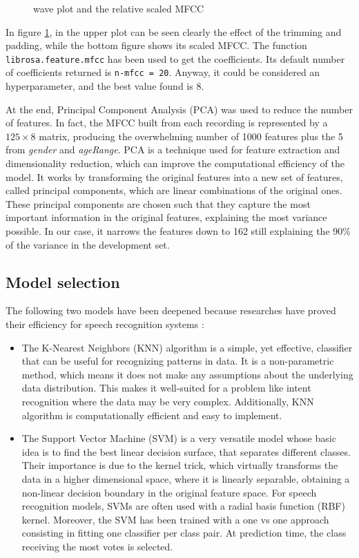 \documentclass[conference]{IEEEtran}
\begin{document}
\begin{figure}
    \centering
    
    \caption{wave plot and the relative scaled MFCC}
    \label{fig:mfcc}
\end{figure}

In figure \ref{fig:mfcc}, in the upper plot can be seen clearly the effect of the trimming and padding, while the bottom figure shows its scaled MFCC. 
The function \texttt{librosa.feature.mfcc} has been used to get the coefficients.
Its default number of coefficients returned is \texttt{n-mfcc = 20}.
Anyway, it could be considered an hyperparameter, and the best value found is 8.

At the end, Principal Component Analysis (PCA) was used to reduce the number of features.
In fact, the MFCC built from each recording is represented by a $125 \times 8$ matrix, producing the overwhelming number of 1000 features plus the 5 from \textit{gender} and \textit{ageRange}.
PCA is a technique used for feature extraction and dimensionality reduction, which can improve the computational efficiency of the model.
It works by transforming the original features into a new set of features, called principal components, which are linear combinations of the original ones.
These principal components are chosen such that they capture the most important information in the original features, explaining the most variance possible.
In our case, it narrows the features down to 162 still explaining the 90\% of the variance in the development set.

\subsection{Model selection}
The following two models have been deepened because researches have proved their efficiency for speech recognition systems \cite{weston:1999}:
\begin{itemize}
    \item The K-Nearest Neighbors (KNN) algorithm is a simple, yet effective, classifier that can be useful for recognizing patterns in data.
    It is a non-parametric method, which means it does not make any assumptions about the underlying data distribution.
    This makes it well-suited for a problem like intent recognition where the data may be very complex.
    Additionally, KNN algorithm is computationally efficient and easy to implement.

    \item The Support Vector Machine (SVM) is a very versatile model whose basic idea is to find the best linear decision surface, that separates different classes.
    Their importance is due to the kernel trick, which virtually transforms the data in a higher dimensional space, where it is linearly separable, obtaining a non-linear decision boundary in the original feature space.
    For speech recognition models, SVMs are often used with a radial basis function (RBF) kernel.
    Moreover, the SVM has been trained with a one vs one approach consisting in fitting one classifier per class pair.
    At prediction time, the class receiving the most votes is selected.
\end{itemize}
\end{document}
